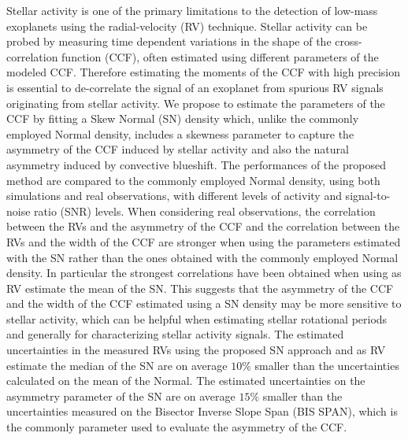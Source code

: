 \documentclass{aa}
\begin{document}
\abstract
{Stellar activity is one of the primary limitations to the detection of low-mass exoplanets using the radial-velocity (RV) technique. 
Stellar activity can be probed by measuring time dependent variations in the shape of the cross-correlation function (CCF), often estimated using different parameters of the modeled CCF. Therefore estimating the moments of the CCF with high precision is essential to de-correlate the signal of an exoplanet from spurious RV signals originating from stellar activity.}
%
{We propose to estimate the parameters of the CCF by fitting a Skew Normal (SN) density which, unlike the commonly employed Normal density, includes a skewness parameter to capture the asymmetry of the CCF induced by stellar activity and also the natural asymmetry induced by convective blueshift.}
%
{The performances of the proposed method are compared to the commonly employed Normal density, using both simulations and real observations, with different levels of activity and signal-to-noise ratio (SNR) levels.}
%
{When considering real observations, the correlation between the RVs and the asymmetry of the CCF and the correlation between the RVs and the width of the CCF are stronger when using the parameters estimated with the SN rather than the ones obtained with the commonly employed Normal density. In particular the strongest correlations have been obtained when using as RV estimate the  mean of the SN.
This suggests that the asymmetry of the CCF and the width of the CCF estimated using a SN density may be more sensitive to stellar activity, which can be helpful when estimating stellar rotational periods and generally for characterizing stellar activity signals.
The estimated uncertainties in the measured RVs using the proposed SN approach and as RV estimate the median of the SN are on average $10\%$ smaller than the uncertainties calculated on the mean of the Normal. The estimated uncertainties on the asymmetry parameter of the SN are on average $15\%$ smaller than the uncertainties measured on the Bisector Inverse Slope Span (BIS SPAN), which is the commonly parameter used to evaluate the asymmetry of the CCF. }
\end{document}
